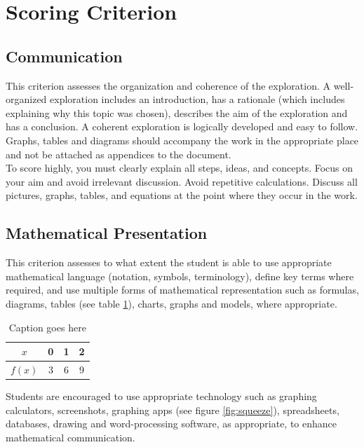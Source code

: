 \documentclass[11pt]{article}
\begin{document}
\section{Scoring Criterion} 
\subsection{Communication}
This criterion assesses the organization and coherence of the exploration. A well-organized exploration includes an introduction, has a rationale (which includes explaining why this topic was chosen), describes the aim of the exploration and has a conclusion. A coherent exploration is logically developed and easy to follow. Graphs, tables and diagrams should accompany the work in the appropriate place and not be attached as appendices to the document.\cite{DBHS2}\\

To score highly, you must clearly explain all steps, ideas, and concepts. Focus on your aim and avoid irrelevant discussion. Avoid repetitive calculations. Discuss all pictures, graphs, tables, and equations at the point where they occur in the work.

\subsection{Mathematical Presentation}
This criterion assesses to what extent the student is able to use appropriate mathematical language (notation, symbols, terminology), define key terms where required, and use multiple forms of mathematical representation such as formulas, diagrams, tables (see table \ref{tab:data1}), charts, graphs and models, where appropriate.\\ 

\begin{table}[H]
	\centering
		\begin{tabular}{|c | c | c | c |} \hline
			$x$ & 0 & 1 & 2\\ \hline
			$f(x)$ & 3 & 6 & 9\\ \hline
		\end{tabular}
	\caption{Caption goes here \protect\footnotemark}
	\label{tab:data1}
\end{table}

Students are encouraged to use appropriate technology such as graphing calculators, screenshots, graphing apps (see figure \ref{fig:squeeze}), spreadsheets, databases, drawing and word-processing software, as appropriate, to
enhance mathematical communication. \\
\end{document}
